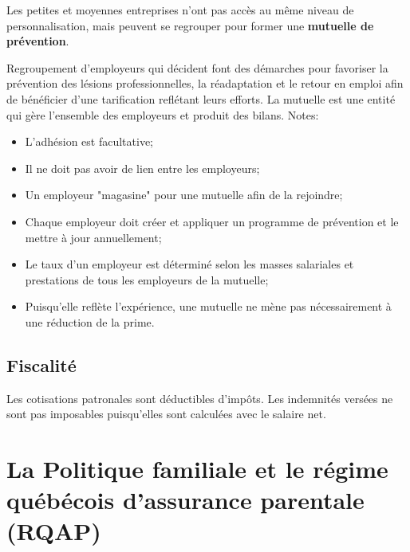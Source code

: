 \documentclass[10pt, french]{article}
\begin{document}
\begin{multicols*}{3}
Les petites et moyennes entreprises n'ont pas accès au même niveau de personnalisation, mais peuvent se regrouper pour former une \textbf{mutuelle de prévention}.

\begin{definitionNOHFILL}
Regroupement d’employeurs qui décident font des démarches pour favoriser la prévention des lésions professionnelles, la réadaptation et le retour en emploi afin de bénéficier d’une tarification reflétant leurs efforts. La mutuelle est une entité qui gère l'ensemble des employeurs et produit des bilans.
\tcbline
Notes:
\begin{itemize}[leftmargin = *]
	\item	L'adhésion est facultative; 
	\item	Il ne doit pas avoir de lien entre les employeurs;
	\item	Un employeur "magasine" pour une mutuelle afin de la rejoindre;
	\item	Chaque employeur doit créer et appliquer un programme de prévention et le mettre à jour annuellement;
	\item	Le taux d'un employeur est déterminé selon les masses salariales et prestations de tous les employeurs de la mutuelle;
	\item	Puisqu'elle reflète l'expérience, une mutuelle ne mène pas nécessairement à une réduction de la prime.
\end{itemize}
\end{definitionNOHFILL}

\subsection*{Fiscalité}
Les cotisations patronales sont déductibles d'impôts.
Les indemnités versées ne sont pas imposables puisqu'elles sont calculées avec le salaire net.


\newpage

\section{La Politique familiale et le régime québécois d’assurance parentale (RQAP)}


\end{multicols*}
\end{document}
